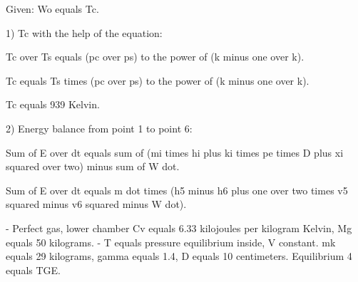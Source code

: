 Given: Wo equals Tc.

1) Tc with the help of the equation:

Tc over Ts equals (pc over ps) to the power of (k minus one over k).

Tc equals Ts times (pc over ps) to the power of (k minus one over k).

Tc equals 939 Kelvin.

2) Energy balance from point 1 to point 6:

Sum of E over dt equals sum of (mi times hi plus ki times pe times D plus xi squared over two) minus sum of W dot.

Sum of E over dt equals m dot times (h5 minus h6 plus one over two times v5 squared minus v6 squared minus W dot).

- Perfect gas, lower chamber Cv equals 6.33 kilojoules per kilogram Kelvin, Mg equals 50 kilograms.
- T equals pressure equilibrium inside, V constant.
mk equals 29 kilograms, gamma equals 1.4, D equals 10 centimeters.
Equilibrium 4 equals TGE.